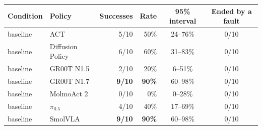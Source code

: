 \begin{tabular}{l l r r c c}
\toprule
Condition & Policy & Successes & Rate & 95\% interval & Ended by a fault \\
\midrule
baseline & ACT & 5/10 & 50\% & 24--76\% & 0/10 \\
baseline & Diffusion Policy & 6/10 & 60\% & 31--83\% & 0/10 \\
baseline & GR00T N1.5 & 2/10 & 20\% & 6--51\% & 0/10 \\
baseline & GR00T N1.7 & \textbf{9/10} & \textbf{90\%} & 60--98\% & 0/10 \\
baseline & MolmoAct 2 & 0/10 & 0\% & 0--28\% & 0/10 \\
baseline & $\pi_{0.5}$ & 4/10 & 40\% & 17--69\% & 0/10 \\
baseline & SmolVLA & \textbf{9/10} & \textbf{90\%} & 60--98\% & 0/10 \\
\bottomrule
\end{tabular}
